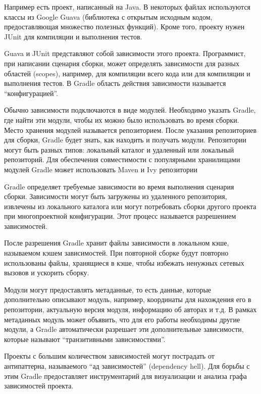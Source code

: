 
Например есть проект, написанный на Java.
В некоторых файлах используются классы из Google Guava (библиотека с открытым исходным кодом, предоставляющая множество полезных функций).
Кроме того, проекту нужен JUnit для компиляции и выполнения тестов.

Guava и JUnit представляют собой зависимости этого проекта.
Программист, при написании сценария сборки, может определять зависимости для разных областей (scopes), например, для компиляции всего кода или для компиляции и выполнения тестов.
В Gradle область действия зависимости называется ``конфигурацией''.

Обычно зависимости подключаются в виде модулей.
Необходимо указать Gradle, где найти эти модули, чтобы их можно было использовать во время сборки.
Место хранения модулей называется репозиторием.
После указания репозиториев для сборки, Gradle будет знать, как находить и получать модули.
Репозитории могут быть разных типов: локальный каталог и удаленный или локальный репозиторий.
Для обеспечения совместимости с популярными хранилищами модулей Gradle может использовать Maven и Ivy репозитории

Gradle определяет требуемые зависимости во время выполнения сценария сборки.
Зависимости могут быть загружены из удаленного репозитория, извлечены из локального каталога или могут потребовать сборки другого проекта при многопроектной конфигурации.
Этот процесс называется разрешением зависимостей.

После разрешения Gradle хранит файлы зависимости в локальном кэше, называемом кэшем зависимостей.
При повторной сборке будут повторно использованы файлы, хранящиеся в кэше, чтобы избежать ненужных сетевых вызовов и ускорить сборку.

Модули могут предоставлять метаданные, то есть данные, которые дополнительно описывают модуль, например, координаты для нахождения его в репозитории, актуальную версия модуля, информацию об авторах и т.д.
В рамках метаданных модуль может объявить, что для его работы необходимы другие модули, а Gradle автоматически разрешает эти дополнительные зависимости, которые называют ``транзитивными зависимостями''.

Проекты с большим количеством зависимостей могут пострадать от антипаттерна, называемого ``ад зависимостей'' (dependency hell).
Для борьбы с этим Gradle предоставляет инструментарий для визуализации и анализа графа зависимостей проекта.

